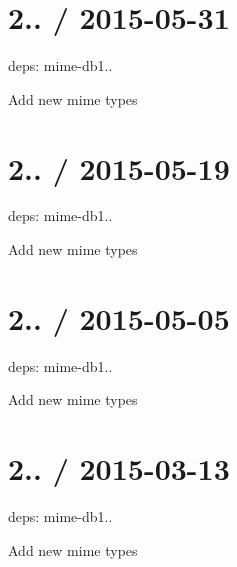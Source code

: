 \section*{2.. / 2015-\/05-\/31 }


\begin{DoxyItemize}
\item deps\+: mime-\/db1..
\begin{DoxyItemize}
\item Add new mime types
\end{DoxyItemize}
\end{DoxyItemize}

\section*{2.. / 2015-\/05-\/19 }


\begin{DoxyItemize}
\item deps\+: mime-\/db1..
\begin{DoxyItemize}
\item Add new mime types
\end{DoxyItemize}
\end{DoxyItemize}

\section*{2.. / 2015-\/05-\/05 }


\begin{DoxyItemize}
\item deps\+: mime-\/db1..
\begin{DoxyItemize}
\item Add new mime types
\end{DoxyItemize}
\end{DoxyItemize}

\section*{2.. / 2015-\/03-\/13 }


\begin{DoxyItemize}
\item deps\+: mime-\/db1..
\begin{DoxyItemize}
\item Add new mime types
\end{DoxyItemize}
\end{DoxyItemize}

